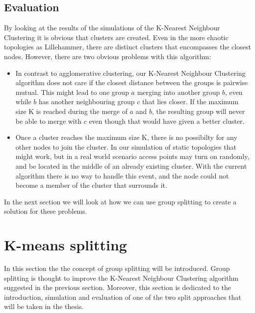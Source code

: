 \subsection{Evaluation}
By looking at the results of the simulations of the K-Nearest Neighbour Clustering it is obvious that clusters are created.  Even in the more chaotic topologies as Lillehammer,
there are distinct clusters that encompasses the closest nodes. However, there are two obvious problems with this algorithm:
\begin{itemize}
	\item In contrast to agglomerative clustering, our K-Nearest Neighbour Clustering algorithm does not care if the closest distance between the groups is pairwise mutual. This
		might lead to one group $a$ merging into another group $b$, even while $b$ has another neighbouring group $c$ that lies closer. If the maximum size K is reached during the merge of
		$a$ and $b$,  the resulting group will never be able to merge with $c$ even though that would have given a better cluster. 
	\item Once a cluster reaches the maximum size K, there is no possibilty for any other nodes to join the cluster.
		In our simulation of static topologies that might work, but in a real world scenario access points may turn on randomly, and be located in the middle of an already existing cluster.
		With the current algorithm there is no way to handle this event, and the node could not become a member of the cluster that surrounds it. 
\end{itemize}

In the next section we will look at how we can use group splitting to create a solution for these problems. 


\section{K-means splitting}
In this section the the concept of group splitting will be introduced. Group splitting is thought to improve the K-Nearest Neighbour Clustering algorithm suggested in the previous section.
Moreover, this section is dedicated to the introduction, simulation and evaluation of one of the two split approaches that will be taken in the thesis.

